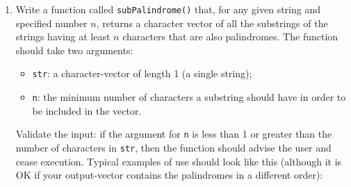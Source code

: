 \documentclass[]{book}
\makeatletter
\newenvironment{Shaded}{\begin{snugshade}}{\end{snugshade}}
\newcommand{\KeywordTok}[1]{\textcolor[rgb]{0.13,0.29,0.53}{\textbf{{#1}}}}
\newcommand{\DecValTok}[1]{\textcolor[rgb]{0.00,0.00,0.81}{{#1}}}
\newcommand{\StringTok}[1]{\textcolor[rgb]{0.31,0.60,0.02}{{#1}}}
\newcommand{\NormalTok}[1]{{#1}}
\providecommand{\tightlist}{%
  \setlength{\itemsep}{0pt}\setlength{\parskip}{0pt}}
\newenvironment{kframe}{%
\medskip{}
\setlength{\fboxsep}{.8em}
 \def\at@end@of@kframe{}%
 \ifinner\ifhmode%
  \def\at@end@of@kframe{\end{minipage}}%
  \begin{minipage}{\columnwidth}%
 \fi\fi%
 \def\FrameCommand##1{\hskip\@totalleftmargin \hskip-\fboxsep
 \colorbox{shadecolor}{##1}\hskip-\fboxsep
     \hskip-\linewidth \hskip-\@totalleftmargin \hskip\columnwidth}%
 \MakeFramed {\advance\hsize-\width
   \@totalleftmargin\z@ \linewidth\hsize
   \@setminipage}}%
 {\par\unskip\endMakeFramed%
 \at@end@of@kframe}
\renewenvironment{Shaded}{\begin{kframe}}{\end{kframe}}
\theoremstyle{definition}
\theoremstyle{definition}
\theoremstyle{remark}
\makeatother
\begin{document}
{\begin{enumerate}
  Validate the input: if the argument for \texttt{n} is less than 1 or
  greater than the number of characters in \texttt{str}, then the
  function should advise the user and cease execution. Typical examples
  of use should look like this (although it is OK if your output-vector
  contains the sub-strings in a different order):

\begin{Shaded}
\begin{Highlighting}[]
\KeywordTok{subStrings}\NormalTok{(}\StringTok{"hello"}\NormalTok{, }\DecValTok{3}\NormalTok{)}
\end{Highlighting}
\end{Shaded}

\begin{verbatim}
## [1] "hello" "hell"  "ello"  "hel"   "ell"   "llo"
\end{verbatim}

\begin{Shaded}
\begin{Highlighting}[]
\KeywordTok{subStrings}\NormalTok{(}\StringTok{"hello"}\NormalTok{, }\DecValTok{6}\NormalTok{)}
\end{Highlighting}
\end{Shaded}

\begin{verbatim}
## n should be at least 1 and no more than the number
## of characters in str.
\end{verbatim}
\item
  Write a function called \texttt{subPalindrome()} that, for any given
  string and specified number \(n\), returns a character vector of all
  the substrings of the strings having at least \(n\) characters that
  are also palindromes. The function should take two arguments:

  \begin{itemize}
  \tightlist
  \item
    \texttt{str}: a character-vector of length 1 (a single string);
  \item
    \texttt{n}: the minimum number of characters a substring should have
    in order to be included in the vector.
  \end{itemize}

  Validate the input: if the argument for \texttt{n} is less than 1 or
  greater than the number of characters in \texttt{str}, then the
  function should advise the user and cease execution. Typical examples
  of use should look like this (although it is OK if your output-vector
  contains the palindromes in a different order):


\end{enumerate}}
\end{document}

